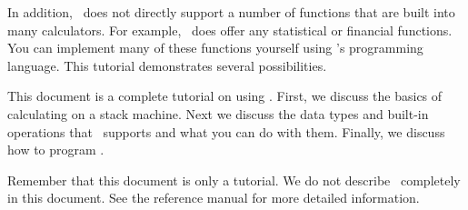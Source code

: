 In addition, \CLAC\ does not directly support a number of functions that are built into many
calculators. For example, \CLAC\ does offer any statistical or financial functions. You can
implement many of these functions yourself using \CLAC's programming language. This tutorial
demonstrates several possibilities.

This document is a complete tutorial on using \CLAC. First, we discuss the basics of calculating
on a stack machine. Next we discuss the data types and built-in operations that \CLAC\ supports
and what you can do with them. Finally, we discuss how to program \CLAC.

Remember that this document is only a tutorial. We do not describe \CLAC\ completely in this
document. See the reference manual for more detailed information.
